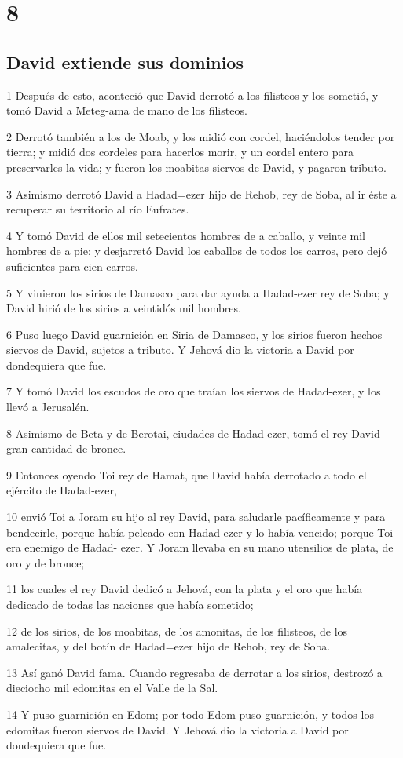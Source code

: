 \chapter{8}

\section*{David extiende sus dominios}

\par 1 Después de esto, aconteció que David derrotó a los filisteos y los sometió, y tomó David a Meteg-ama de mano de los filisteos.
\par 2 Derrotó también a los de Moab, y los midió con cordel, haciéndolos tender por tierra; y midió dos cordeles para hacerlos morir, y un cordel entero para preservarles la vida; y fueron los moabitas siervos de David, y pagaron tributo.
\par 3 Asimismo derrotó David a Hadad=ezer hijo de Rehob, rey de Soba, al ir éste a recuperar su territorio al río Eufrates.
\par 4 Y tomó David de ellos mil setecientos hombres de a caballo, y veinte mil hombres de a pie; y desjarretó David los caballos de todos los carros, pero dejó suficientes para cien carros.
\par 5 Y vinieron los sirios de Damasco para dar ayuda a Hadad-ezer rey de Soba; y David hirió de los sirios a veintidós mil hombres.
\par 6 Puso luego David guarnición en Siria de Damasco, y los sirios fueron hechos siervos de David, sujetos a tributo. Y Jehová dio la victoria a David por dondequiera que fue.
\par 7 Y tomó David los escudos de oro que traían los siervos de Hadad-ezer, y los llevó a Jerusalén.
\par 8 Asimismo de Beta y de Berotai, ciudades de Hadad-ezer, tomó el rey David gran cantidad de bronce.
\par 9 Entonces oyendo Toi rey de Hamat, que David había derrotado a todo el ejército de Hadad-ezer,
\par 10 envió Toi a Joram su hijo al rey David, para saludarle pacíficamente y para bendecirle, porque había peleado con Hadad-ezer y lo había vencido; porque Toi era enemigo de Hadad- ezer. Y Joram llevaba en su mano utensilios de plata, de oro y de bronce;
\par 11 los cuales el rey David dedicó a Jehová, con la plata y el oro que había dedicado de todas las naciones que había sometido;
\par 12 de los sirios, de los moabitas, de los amonitas, de los filisteos, de los amalecitas, y del botín de Hadad=ezer hijo de Rehob, rey de Soba.
\par 13 Así ganó David fama. Cuando regresaba de derrotar a los sirios, destrozó a dieciocho mil edomitas en el Valle de la Sal. 
\par 14 Y puso guarnición en Edom; por todo Edom puso guarnición, y todos los edomitas fueron siervos de David. Y Jehová dio la victoria a David por dondequiera que fue.

